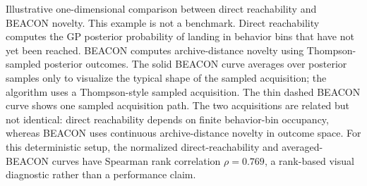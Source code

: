 \caption{Illustrative one-dimensional comparison between direct reachability and BEACON novelty. This example is not a benchmark. Direct reachability computes the GP posterior probability of landing in behavior bins that have not yet been reached. BEACON computes archive-distance novelty using Thompson-sampled posterior outcomes. The solid BEACON curve averages over posterior samples only to visualize the typical shape of the sampled acquisition; the algorithm uses a Thompson-style sampled acquisition. The thin dashed BEACON curve shows one sampled acquisition path. The two acquisitions are related but not identical: direct reachability depends on finite behavior-bin occupancy, whereas BEACON uses continuous archive-distance novelty in outcome space. For this deterministic setup, the normalized direct-reachability and averaged-BEACON curves have Spearman rank correlation $\rho=0.769$, a rank-based visual diagnostic rather than a performance claim.}
